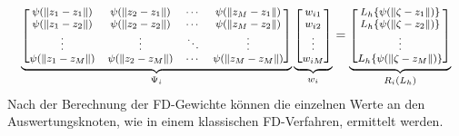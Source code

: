 \documentclass[12pt,titlepage]{article}
\begin{document}
\begin{align*}
 {\footnotesize
\underbrace{\begin{bmatrix}
  \psi(\|z_1-z_1\|) & \psi(\|z_2-z_1\|) & \cdots & \psi(\|z_M-z_1\|) \\
 \psi(\|z_1-z_2\|) & \psi(\|z_2-z_2\|) & \cdots & \psi(\|z_M-z_2\|) \\
 \vdots & \vdots & \ddots & \vdots \\
 \psi(\|z_1-z_M\|) & \psi(\|z_2-z_M\|) & \cdots & \psi(\|z_M-z_M\|)
\end{bmatrix}}_{\Psi_i}
\underbrace{\begin{bmatrix}
 w_{i1} \\
 w_{i2} \\
 \vdots \\
 w_{iM}
\end{bmatrix}}_{w_i}
=
\underbrace{\begin{bmatrix}
 L_h\{\psi(\|\zeta-z_1\|)\} \\
 L_h\{\psi(\|\zeta-z_2\|)\} \\
 \vdots \\
 L_h\{\psi(\|\zeta-z_M\|)\}
\end{bmatrix}}_{R_i(L_h)}
}
\end{align*}
Nach der Berechnung der FD-Gewichte können die einzelnen Werte an den Auswertungsknoten, wie in einem klassischen FD-Verfahren, ermittelt werden.
\end{document}
